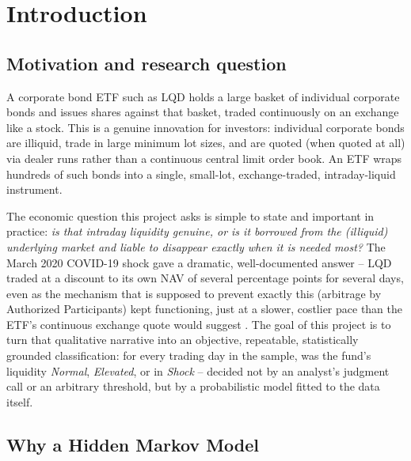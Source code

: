 \documentclass[11pt]{article}
\theoremstyle{definition}
\theoremstyle{remark}
\begin{document}
\newpage
\tableofcontents
\newpage

\section{Introduction}
\label{sec:intro}

\subsection{Motivation and research question}

A corporate bond ETF such as LQD holds a large basket of individual corporate bonds and issues shares against that basket, traded continuously on an exchange like a stock. This is a genuine innovation for investors: individual corporate bonds are illiquid, trade in large minimum lot sizes, and are quoted (when quoted at all) via dealer runs rather than a continuous central limit order book. An ETF wraps hundreds of such bonds into a single, small-lot, exchange-traded, intraday-liquid instrument.

The economic question this project asks is simple to state and important in practice: \emph{is that intraday liquidity genuine, or is it borrowed from the (illiquid) underlying market and liable to disappear exactly when it is needed most?} The March 2020 COVID-19 shock gave a dramatic, well-documented answer -- LQD traded at a discount to its own NAV of several percentage points for several days, even as the mechanism that is supposed to prevent exactly this (arbitrage by Authorized Participants) kept functioning, just at a slower, costlier pace than the ETF's continuous exchange quote would suggest \cite{ohara2021anatomy}. The goal of this project is to turn that qualitative narrative into an objective, repeatable, statistically grounded classification: for every trading day in the sample, was the fund's liquidity \emph{Normal}, \emph{Elevated}, or in \emph{Shock} -- decided not by an analyst's judgment call or an arbitrary threshold, but by a probabilistic model fitted to the data itself.

\subsection{Why a Hidden Markov Model}
\end{document}
